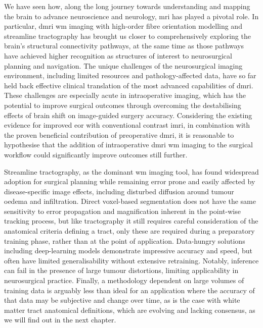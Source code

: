 \documentclass[12pt,phd,a4paper,twoside]{ucl_thesis}
\begin{document}
We have seen how, along the long journey towards understanding and mapping the brain to advance neuroscience and neurology, \gls{mri} has played a pivotal role.
In particular, \gls{dmri} \gls{wm} imaging with high-order fibre orientation modelling and streamline tractography has brought us closer to comprehensively exploring the brain's structural connectivity pathways, at the same time as those pathways have achieved higher recognition as structures of interest to neurosurgical planning and navigation.
The unique challenges of the neurosurgical imaging environment, including limited resources and pathology-affected data, have so far held back effective clinical translation of the most advanced capabilities of \gls{dmri}.
These challenges are especially acute in intraoperative imaging, which has the potential to improve surgical outcomes through overcoming the destabilising effects of brain shift on image-guided surgery accuracy.
Considering the existing evidence for improved \gls{eor} with conventional contrast \gls{imri}, in combination with the proven beneficial contribution of preoperative \gls{dmri}, it is reasonable to hypothesise that the addition of intraoperative \gls{dmri} \gls{wm} imaging to the surgical workflow could significantly improve outcomes still further\autocite{Manan2022}.

Streamline tractography, as the dominant \gls{wm} imaging tool, has found widespread adoption for surgical planning while remaining error prone and easily affected by disease-specific image effects, including disturbed diffusion around tumour oedema and infiltration.
Direct voxel-based segmentation does not have the same sensitivity to error propagation and magnification inherent in the point-wise tracking process, but like tractography it still requires careful consideration of the anatomical criteria defining a tract, only these are required during a preparatory training phase, rather than at the point of application.
Data-hungry solutions including deep-learning models demonstrate impressive accuracy and speed, but often have limited generalisability without extensive retraining.
Notably, inference can fail in the presence of large tumour distortions, limiting applicability in neurosurgical practice.
Finally, a methodology dependent on large volumes of training data is arguably less than ideal for an application where the accuracy of that data may be subjective and change over time, as is the case with white matter tract anatomical definitions, which are evolving and lacking consensus, as we will find out in the next chapter.
\end{document}
